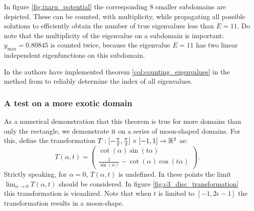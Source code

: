 In figure \ref{fig:ixaru_potential} the corresponding $8$ smaller subdomains are depicted. These can be counted, with multiplicity, while propagating all possible solutions to efficiently obtain the number of true eigenvalues less than $E = 11$. Do note that the multiplicity of the eigenvalue on a subdomain is important: $y_\text{max}=0.80845$ is counted twice, because the eigenvalue $E=11$ has two linear independent eigenfunctions on this subdomain.

In \cite{baeyens_improvements_2022} the authors have implemented theorem \ref{col:counting_eigenvalues} in the method from \cite{ixaru_new_2010} to reliably determine the index of all eigenvalues.

\subsubsection{A test on a more exotic domain}

As a numerical demonstration that this theorem is true for more domains than only the rectangle, we demonstrate it on a series of moon-shaped domains. For this, define the transformation $T:[-\frac{\pi}{2}, \frac{\pi}{2}] \times [-1, 1] \to \mathbb{R}^2$ as:
\begin{equation}\label{equ:c3_disc_transformation}
    T(\alpha, t) = \begin{pmatrix}
        \cot(\alpha) \sin(t \alpha) \\
        \frac{1}{\sin(\alpha)} - \cot(\alpha) \cos(t \alpha)
    \end{pmatrix}\text{.}
\end{equation}
Strictly speaking, for $\alpha = 0$,  $T(\alpha, t)$ is undefined. In these points the limit $\lim_{\alpha \to 0} T(\alpha, t)$ should be considered. In figure \ref{fig:c3_disc_transformation} this transformation is visualized. Note that when $t$ is limited to $[-1, 2\epsilon -1]$ the transformation results in a moon-shape.

